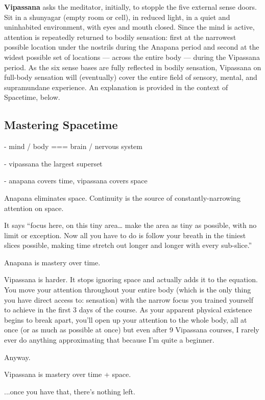 \documentclass[a4paper, amsfonts, amssymb, amsmath, reprint, showkeys, nofootinbib, twoside]{revtex4-1}
\begin{document}
\textbf{Vipassana} asks the meditator, initially, to stopple the five external sense
doors. Sit in a shunyagar (empty room or cell), in reduced light, in a quiet and uninhabited
environment, with eyes and mouth closed. Since the mind is active, attention is
repeatedly returned to bodily sensation: first at the narrowest possible location
under the nostrils during the Anapana period and second at the widest possible set of
locations --- across the entire body --- during the Vipassana period. As the six
sense bases are fully reflected in bodily sensation, Vipassana on full-body sensation
will (eventually) cover the entire field of sensory, mental, and supramundane
experience. An explanation is provided in the context of Spacetime, below.

\subsection{Mastering Spacetime}



- mind / body === brain / nervous system

- vipassana the largest superset

- anapana covers time, vipassana covers space

Anapana eliminates space. Continuity is the source of constantly-narrowing attention on space.

It says “focus here, on this tiny area… make the area as tiny as possible, with no
limit or exception. Now all you have to do is follow your breath in the tiniest
slices possible, making time stretch out longer and longer with every sub-slice.”


Anapana is mastery over time.

Vipassana is harder. It stops ignoring space and actually adds it to the equation. You move your attention throughout your entire body (which is the only thing you have direct access to: sensation) with the narrow focus you trained yourself to achieve in the first 3 days of the course. As your apparent physical existence begins to break apart, you’ll open up your attention to the whole body, all at once (or as much as possible at once) but even after 9 Vipassana courses, I rarely ever do anything approximating that because I’m quite a beginner. 🙂

Anyway.

Vipassana is mastery over time + space.

...once you have that, there’s nothing left.
\end{document}
